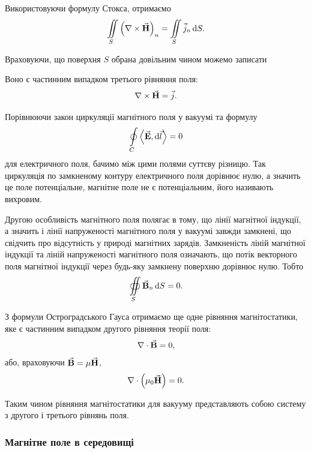 Використовуючи формулу Стокса, отримаємо 
\begin{equation}
	\displaystyle\iint\limits_S \left(\nabla \times {\vec{\mathbf{H}}}\right)_n = \displaystyle\iint\limits_S \vec j_n \mathop{}\!\mathrm{d} S.
\end{equation}

Враховуючи, що поверхня $S$ обрана довільним чином можемо записати 
\begin{th_equation}[магнітостатики]
	Воно є частинним випадком третього рівняння поля:
	\begin{equation}
		\nabla \times {\vec{\mathbf{H}}} = \vec j.
	\end{equation}
\end{th_equation}
Порівнюючи закон циркуляції магнітного поля у вакуумі та формулу
\begin{equation}
	\Oint_C \langle \vecf E, \diff \vec l \rangle = 0
\end{equation}
для електричного поля, бачимо між цими полями суттєву різницю. Так циркуляція по замкненому контуру електричного поля дорівнює нулю, а значить це поле потенціальне, магнітне поле не є потенціальним, його називають вихровим. \medskip

Другою особливість магнітного поля полягає в тому, що лінії магнітної індукції, а значить і лінії напруженості магнітного поля у вакуумі завжди замкнені, що свідчить про відсутність у природі магнітних зарядів. Замкненість ліній магнітної індукції та ліній напруженості магнітного поля означають, що потік векторного поля магнітної індукції через будь-яку замкнену поверхню дорівнює нулю. Тобто
\begin{equation}
	\displaystyle\oiint\limits_S {\vec{\mathbf{B}}}_n \mathop{}\!\mathrm{d} S = 0.
\end{equation}

З формули Остроградського Гауса отримаємо ще одне рівняння магнітостатики, яке є частинним випадком другого рівняння теорії поля:
\begin{equation}
	\nabla \cdot {\vec{\mathbf{B}}} = 0,
\end{equation}
або, враховуючи ${\vec{\mathbf{B}}} = \mu {\vec{\mathbf{H}}}$,
\begin{equation}
	\nabla \cdot \left(\mu_0 {\vec{\mathbf{H}}}\right) = 0.
\end{equation}

Таким чином рівняння магнітостатики для вакууму представляють собою систему з другого і третього рівнянь поля.

\subsubsection{Магнітне поле в середовищі}

